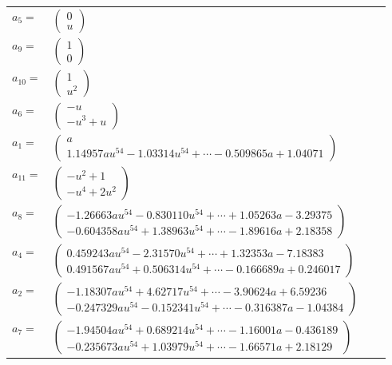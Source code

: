 \documentclass[1p]{elsarticle_modified}
\theoremstyle{definition}
\begin{document}
\begin{tabular}{m{7pt} m{180pt} m{7pt} m{180pt} }
\flushright $a_{5}=$&$\begin{pmatrix}0\\u\end{pmatrix}$ \\
\flushright $a_{9}=$&$\begin{pmatrix}1\\0\end{pmatrix}$ \\
\flushright $a_{10}=$&$\begin{pmatrix}1\\u^2\end{pmatrix}$ \\
\flushright $a_{6}=$&$\begin{pmatrix}- u\\- u^3+u\end{pmatrix}$ \\
\flushright $a_{1}=$&$\begin{pmatrix}a\\1.14957 a u^{54}-1.03314 u^{54}+\cdots-0.509865 a+1.04071\end{pmatrix}$ \\
\flushright $a_{11}=$&$\begin{pmatrix}- u^2+1\\- u^4+2 u^2\end{pmatrix}$ \\
\flushright $a_{8}=$&$\begin{pmatrix}-1.26663 a u^{54}-0.830110 u^{54}+\cdots+1.05263 a-3.29375\\-0.604358 a u^{54}+1.38963 u^{54}+\cdots-1.89616 a+2.18358\end{pmatrix}$ \\
\flushright $a_{4}=$&$\begin{pmatrix}0.459243 a u^{54}-2.31570 u^{54}+\cdots+1.32353 a-7.18383\\0.491567 a u^{54}+0.506314 u^{54}+\cdots-0.166689 a+0.246017\end{pmatrix}$ \\
\flushright $a_{2}=$&$\begin{pmatrix}-1.18307 a u^{54}+4.62717 u^{54}+\cdots-3.90624 a+6.59236\\-0.247329 a u^{54}-0.152341 u^{54}+\cdots-0.316387 a-1.04384\end{pmatrix}$ \\
\flushright $a_{7}=$&$\begin{pmatrix}-1.94504 a u^{54}+0.689214 u^{54}+\cdots-1.16001 a-0.436189\\-0.235673 a u^{54}+1.03979 u^{54}+\cdots-1.66571 a+2.18129\end{pmatrix}$ \\

\end{tabular}
\end{document}
